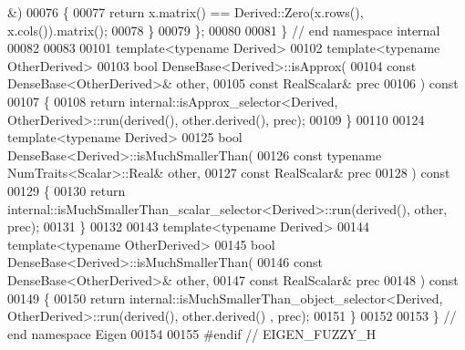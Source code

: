 \begin{DoxyCode}
      &)
00076   \{
00077     \textcolor{keywordflow}{return} x.matrix() == Derived::Zero(x.rows(), x.cols()).matrix();
00078   \}
00079 \};
00080 
00081 \} \textcolor{comment}{// end namespace internal}
00082 
00083 
00101 \textcolor{keyword}{template}<\textcolor{keyword}{typename} Derived>
00102 \textcolor{keyword}{template}<\textcolor{keyword}{typename} OtherDerived>
00103 \textcolor{keywordtype}{bool} DenseBase<Derived>::isApprox(
00104   \textcolor{keyword}{const} DenseBase<OtherDerived>& other,
00105   \textcolor{keyword}{const} RealScalar& prec
00106 )\textcolor{keyword}{ const}
00107 \textcolor{keyword}{}\{
00108   \textcolor{keywordflow}{return} internal::isApprox\_selector<Derived, OtherDerived>::run(derived(), other.derived(), prec);
00109 \}
00110 
00124 \textcolor{keyword}{template}<\textcolor{keyword}{typename} Derived>
00125 \textcolor{keywordtype}{bool} DenseBase<Derived>::isMuchSmallerThan(
00126   \textcolor{keyword}{const} \textcolor{keyword}{typename} NumTraits<Scalar>::Real& other,
00127   \textcolor{keyword}{const} RealScalar& prec
00128 )\textcolor{keyword}{ const}
00129 \textcolor{keyword}{}\{
00130   \textcolor{keywordflow}{return} internal::isMuchSmallerThan\_scalar\_selector<Derived>::run(derived(), other, prec);
00131 \}
00132 
00143 \textcolor{keyword}{template}<\textcolor{keyword}{typename} Derived>
00144 \textcolor{keyword}{template}<\textcolor{keyword}{typename} OtherDerived>
00145 \textcolor{keywordtype}{bool} DenseBase<Derived>::isMuchSmallerThan(
00146   \textcolor{keyword}{const} DenseBase<OtherDerived>& other,
00147   \textcolor{keyword}{const} RealScalar& prec
00148 )\textcolor{keyword}{ const}
00149 \textcolor{keyword}{}\{
00150   \textcolor{keywordflow}{return} internal::isMuchSmallerThan\_object\_selector<Derived, OtherDerived>::run(derived(), other.derived()
      , prec);
00151 \}
00152 
00153 \} \textcolor{comment}{// end namespace Eigen}
00154 
00155 \textcolor{preprocessor}{#endif // EIGEN\_FUZZY\_H}
\end{DoxyCode}

